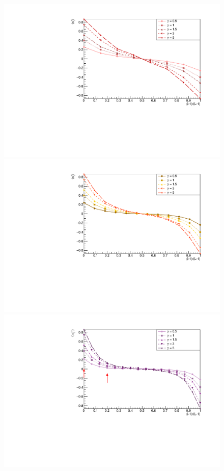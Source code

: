 \begin{figure}[H]
\centering
    \includegraphics[scale=0.55]{Figures/8sites/8sites_LMvsGamma.pdf}
    \label{fig:8sites_LMvsGamma}
    \includegraphics[scale=0.55]{Figures/12sites/12sites_LMvsGamma.pdf}
    \label{fig:12sites_LMvsGamma}
    \includegraphics[scale=0.55]{Figures/16sites/16sites_LMvsGamma.pdf}

\end{figure}
